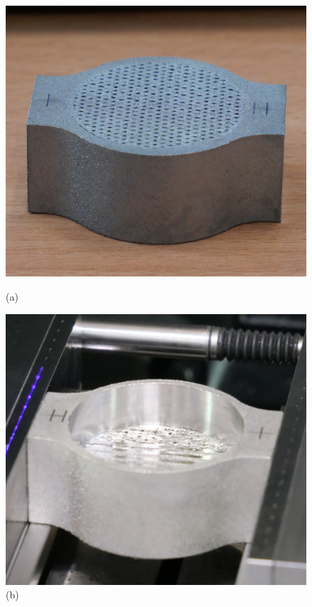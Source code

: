 \begin{figure}[H]
    \centering
    \begin{minipage}{.33\textwidth}
      \centering
      \includegraphics[width=0.9\linewidth]{images/AM0_crop.JPG}
      \caption*{(a)}
    \end{minipage}%
    \begin{minipage}{.33\textwidth}
      \centering
      \includegraphics[width=0.9\linewidth]{images/AM1_crop.JPG}
      \caption*{(b)}
    \end{minipage}
    \begin{minipage}{.33\textwidth}

\end{minipage}
\end{figure}
